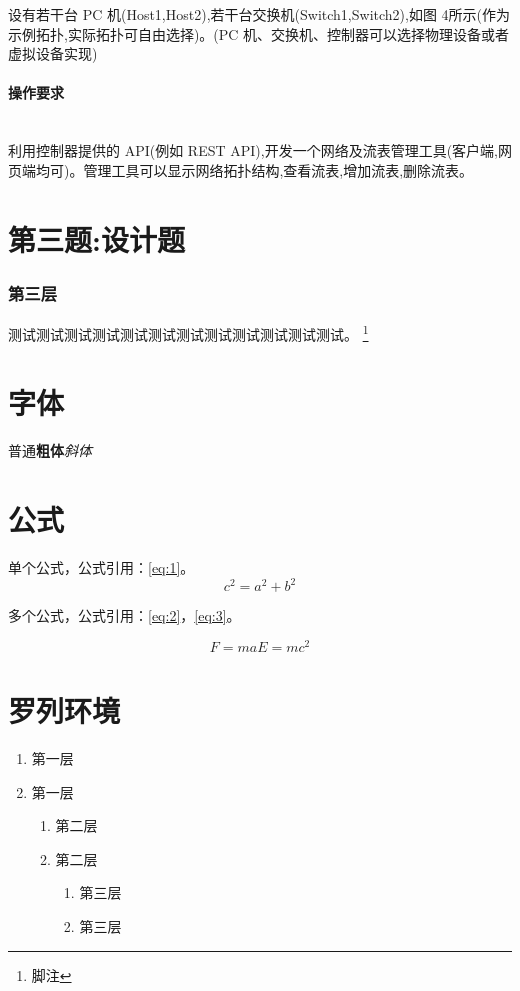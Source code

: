 \documentclass[format=draft,language=chinese,category=SDN]{hustreport}
\newcommand{\myparagraph}[1]{\paragraph{#1}\mbox{}\\}
\begin{document}
设有若干台 PC 机(Host1,Host2),若干台交换机(Switch1,Switch2),如图 4所示(作为示例拓扑,实际拓扑可自由选择)。(PC 机、交换机、控制器可以选择物理设备或者虚拟设备实现)

\myparagraph{操作要求}

利用控制器提供的 API(例如 REST API),开发一个网络及流表管理工具(客户端,网页端均可)。管理工具可以显示网络拓扑结构,查看流表,增加流表,删除流表。


\section{第三题:设计题}\label{sec:Q3}

\subsubsection{第三层}\label{sec:3}
测试测试测试测试测试测试测试测试测试测试测试测试。
\footnote{\label{footnote:1}脚注}

\section{字体}

普通\textbf{粗体}\emph{斜体}


\section{公式}

单个公式，公式引用：\autoref{eq:1}。
\begin{equation}
 c^2 = a^2 + b^2 \label{eq:1}
\end{equation}

多个公式，公式引用：\autoref{eq:2}，\autoref{eq:3}。

\begin{subequations}
\begin{equation}
  F = ma \label{eq:2}
\end{equation}
\begin{equation}
  E = mc^2 \label{eq:3}
\end{equation}
\end{subequations}

\section{罗列环境}

\begin{enumerate}
    \item 第一层\label{item:1}
    \item 第一层
    \begin{enumerate}
        \item 第二层\label{item:2}
        \item 第二层
        \begin{enumerate}
            \item 第三层\label{item:3}
            \item 第三层
        \end{enumerate}
    \end{enumerate}
\end{enumerate}
\end{document}

